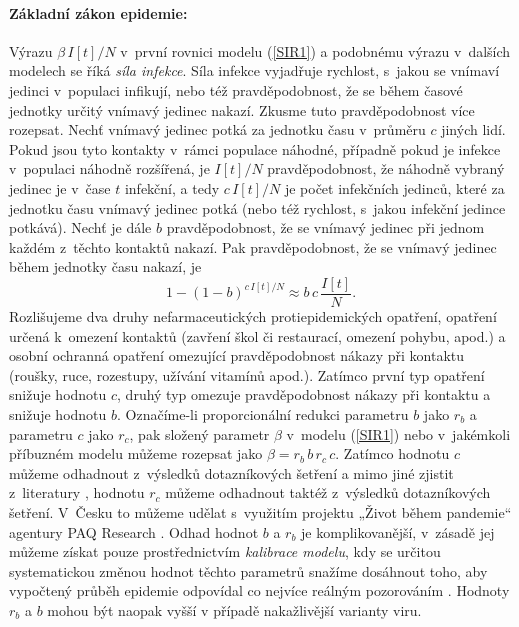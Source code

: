 \paragraph{Základní zákon epidemie:} Výrazu $\beta\,I[t]/N$ v~první rovnici modelu (\ref{SIR1}) a podobnému výrazu v~dalších modelech se říká \emph{síla infekce}. Síla infekce vyjadřuje rychlost, s~jakou se vnímaví jedinci v~populaci infikují, nebo též pravděpodobnost, že se během časové jednotky určitý vnímavý jedinec nakazí. Zkusme tuto pravděpodobnost více rozepsat. Nechť vnímavý jedinec potká za jednotku času v~průměru $c$ jiných lidí. Pokud jsou tyto kontakty v~rámci populace náhodné, případně pokud je infekce v~populaci náhodně rozšířená, je $I[t]/N$ pravděpodobnost, že náhodně vybraný jedinec je v~čase $t$ infekční, a tedy $c\,I[t]/N$ je počet infekčních jedinců, které za jednotku času vnímavý jedinec potká (nebo též rychlost, s~jakou infekční jedince potkává). Nechť je dále $b$ pravděpodobnost, že se vnímavý jedinec při jednom každém z~těchto kontaktů nakazí. Pak pravděpodobnost, že se vnímavý jedinec během jednotky času nakazí, je 
\begin{equation}
1-(1-b)^{c\,I[t]/N} \approx b\, c \, \frac{I[t]}{N}.
\end{equation}
Rozlišujeme dva druhy nefarmaceutických protiepidemických opatření, opatření ur\-če\-ná k~omezení kontaktů (zavření škol či restaurací, omezení pohybu, apod.) a osobní ochranná opatření omezující pravděpodobnost nákazy při kontaktu (roušky, ruce, rozestupy, užívání vitamínů apod.). Zatímco první typ opatření snižuje hodnotu $c$, druhý typ omezuje pravděpodobnost nákazy při kontaktu a snižuje hodnotu $b$. Označíme-li proporcionální redukci parametru $b$ jako $r_b$ a parametru $c$ jako $r_c$, pak složený parametr $\beta$ v~modelu (\ref{SIR1}) nebo v~jakémkoli příbuzném modelu můžeme rozepsat jako $\beta = r_b\,b\,r_c\,c$. Zatímco hodnotu $c$ můžeme odhadnout z~výsledků dotazníkových šetření a mimo jiné zjistit z~literatury \cite{Prem_etal2017}, hodnotu $r_c$ můžeme odhadnout taktéž z~výsledků dotazníkových šetření. V~Česku to můžeme udělat s~využitím projektu „Život během pandemie“ agentury PAQ Research \cite[\url{www.zivotbehempandemie.cz}]{paqcovid}. Odhad hodnot $b$ a $r_b$ je komplikovanější, v~zásadě jej můžeme získat pouze prostřednictvím \emph{kalibrace modelu}, kdy se určitou systematickou změnou hodnot těchto parametrů snažíme dosáhnout toho, aby vypočtený průběh epidemie odpovídal co nejvíce reálným pozorováním \cite{Yang_etal2014,King_etal2016}. Hodnoty $r_b$ a $b$ mohou být naopak vyšší v případě nakažlivější varianty viru.

